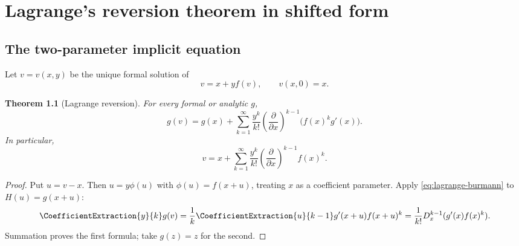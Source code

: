 \documentclass[11pt,a4paper,oneside,openany]{book}
\newtheorem{theorem}{Theorem}[chapter]
\theoremstyle{definition}
\theoremstyle{remark}
\begin{document}
\chapter{Lagrange's reversion theorem in shifted form}

\section{The two-parameter implicit equation}
Let $v=v(x,y)$ be the unique formal solution of
\begin{equation}\label{eq:shifted-reversion-equation}
 v=x+yf(v),
 \qquad v(x,0)=x.
\end{equation}

\begin{theorem}[Lagrange reversion]\label{thm:shifted-lagrange-reversion}
For every formal or analytic $g$,
\begin{equation}\label{eq:shifted-lagrange-reversion}
 g(v)=g(x)+\sum_{k=1}^{\infty}\frac{y^k}{k!}
 \left(\frac{\partial}{\partial x}\right)^{k-1}
 \bigl(f(x)^kg'(x)\bigr).
\end{equation}
In particular,
\begin{equation}\label{eq:shifted-lagrange-v}
 v=x+\sum_{k=1}^{\infty}\frac{y^k}{k!}
 \left(\frac{\partial}{\partial x}\right)^{k-1}f(x)^k.
\end{equation}
\end{theorem}
\begin{proof}
Put $u=v-x$.  Then $u=y\phi(u)$ with $\phi(u)=f(x+u)$, treating $x$ as a
coefficient parameter.  Apply \eqref{eq:lagrange-burmann} to
$H(u)=g(x+u)$:
\[
 \CoefficientExtraction{y}{k}g(v)=\frac1k\CoefficientExtraction{u}{k-1}g'(x+u)f(x+u)^k
 =\frac1{k!}D_x^{k-1}(g'(x)f(x)^k).
\]
Summation proves the first formula; take $g(z)=z$ for the second.
\end{proof}
\end{document}
